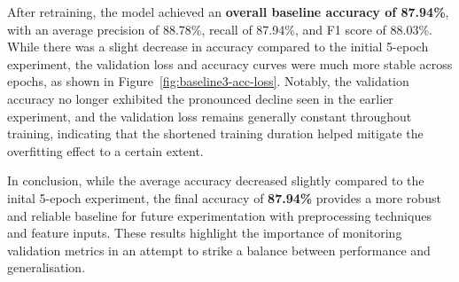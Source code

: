 After retraining, the model achieved an \textbf{overall baseline accuracy of 87.94\%}, with an average precision of 88.78\%, recall of 87.94\%, and F1 score of 88.03\%. While there was a slight decrease in accuracy compared to the initial 5-epoch experiment, the validation loss and accuracy curves were much more stable across epochs, as shown in Figure~\ref{fig:baseline3-acc-loss}. Notably, the validation accuracy no longer exhibited the pronounced decline seen in the earlier experiment, and the validation loss remains generally constant throughout training, indicating that the shortened training duration helped mitigate the overfitting effect to a certain extent.

In conclusion, while the average accuracy decreased slightly compared to the inital 5-epoch experiment, the final accuracy of \textbf{87.94\%} provides a more robust and reliable baseline for future experimentation with preprocessing techniques and feature inputs. These results highlight the importance of monitoring validation metrics in an attempt to strike a balance between performance and generalisation.

